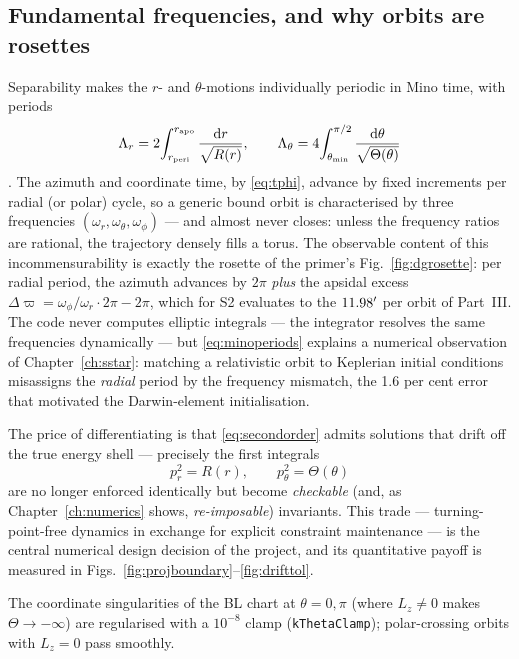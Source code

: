 \subsection{Fundamental frequencies, and why orbits are rosettes}
\label{sec:frequencies}

Separability makes the $r$- and $\theta$-motions individually periodic
in Mino time, with periods
\begin{equation}
\Lambda_r = 2\!\int_{r_{\rm peri}}^{r_{\rm apo}}
\frac{\mathrm{d}r}{\sqrt{R(r)}},
\qquad
\Lambda_\theta = 4\!\int_{\theta_{\min}}^{\pi/2}
\frac{\mathrm{d}\theta}{\sqrt{\Theta(\theta)}}
\label{eq:minoperiods}
\end{equation}
\citep{Mino2003}. The azimuth and coordinate time, by \eqref{eq:tphi},
advance by fixed increments per radial (or polar) cycle, so a generic
bound orbit is characterised by three frequencies
$(\omega_r, \omega_\theta, \omega_\phi)$ — and almost never closes:
unless the frequency ratios are rational, the trajectory densely fills
a torus. The observable content of this incommensurability is exactly
the rosette of the primer's Fig.~\ref{fig:dgrosette}: per radial
period, the azimuth advances by $2\pi$ \emph{plus} the apsidal excess
$\Delta\varpi = \omega_\phi/\omega_r \cdot 2\pi - 2\pi$, which for S2
evaluates to the $11.98'$ per orbit of Part~III. The code never
computes elliptic integrals — the integrator resolves the same
frequencies dynamically — but \eqref{eq:minoperiods} explains a
numerical observation of Chapter~\ref{ch:sstar}: matching a
relativistic orbit to Keplerian initial conditions misassigns the
\emph{radial} period by the frequency mismatch, the 1.6 per cent error
that motivated the Darwin-element initialisation.

The price of differentiating is that \eqref{eq:secondorder} admits
solutions that drift off the true energy shell — precisely the first
integrals
\begin{equation}
p_r^2 = R(r), \qquad p_\theta^2 = \Theta(\theta)
\label{eq:constraints}
\end{equation}
are no longer enforced identically but become \emph{checkable} (and, as
Chapter~\ref{ch:numerics} shows, \emph{re-imposable}) invariants. This
trade — turning-point-free dynamics in exchange for explicit constraint
maintenance — is the central numerical design decision of the project,
and its quantitative payoff is measured in
Figs.~\ref{fig:projboundary}--\ref{fig:drifttol}.

The coordinate singularities of the BL chart at $\theta = 0, \pi$
(where $L_z \neq 0$ makes $\Theta \to -\infty$) are regularised with a
$10^{-8}$ clamp (\texttt{kThetaClamp}); polar-crossing orbits with
$L_z = 0$ pass smoothly.


